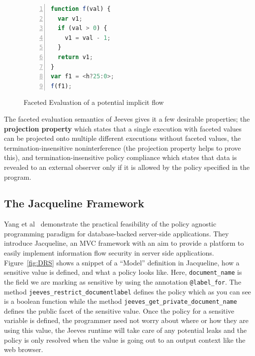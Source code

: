 \begin{figure}
	\begin{lstlisting}[language=javascript,frame=single, breaklines=true,basicstyle=\footnotesize\ttfamily, numbers=left, extendedchars=true, tabsize=2]
function f(val) {
  var v1;
  if (val > 0) {
    v1 = val - 1;
  }
  return v1;
}
var f1 = <h?25:0>;
f(f1);
\end{lstlisting}
\caption{Faceted Evaluation of a potential implicit flow}
\label{fig:implicit flow}
\end{figure}

The faceted evaluation semantics of Jeeves gives it a few desirable properties;
the \textbf{projection property} which states that a single execution with faceted
values can be projected onto multiple different executions without faceted values,
the termination-insensitive noninterference (the projection property helps to prove
this), and termination-insensitive policy compliance which states that data is revealed
to an external observer only if it is allowed by the policy specified in the program.

\subsection{The Jacqueline Framework}
Yang et al~\cite{Jacqueline} demonstrate the practical feasibility of the policy
agnostic programming paradigm for database-backed server-side applications.
They introduce Jacqueline, an MVC framework with an aim to provide a platform to
easily implement information flow security in server side applications. Figure~\ref{fig:DRS}
shows a snippet of a ``Model'' definition in Jacqueline, how a sensitive value is
defined, and what a policy looks like. Here, \texttt{document\_name} is the field
we are marking as sensitive by using the annotation \texttt{@label\_for}. The method
\texttt{jeeves\_restrict\_documentlabel} defines the policy which as you can see
is a boolean function while the method \texttt{jeeves\_get\_private\_document\_name}
defines the public facet of the sensitive value. Once the policy for a sensitive
variable is defined, the programmer need not worry about where or how they are
using this value, the Jeeves runtime will take care of any potential leaks and the
policy is only resolved when the value is going out to an output context like the
web browser.


